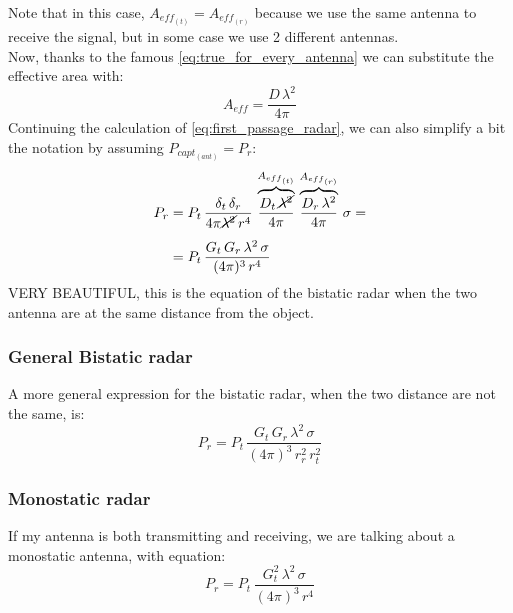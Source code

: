 Note that in this case, $A_{eff_{(t)}}=A_{eff_{(r)}}$ because we use the same antenna to receive the signal, but in some case we use 2 different antennas.\\
Now, thanks to the famous \cref{eq:true_for_every_antenna} we can substitute the effective area with:
\begin{equation}
    A_{eff}=\frac{D\,\lambda^2}{4\pi}
\end{equation}
Continuing the calculation of \cref{eq:first_passage_radar}, we can also simplify a bit the notation by assuming $P_{capt_{(ant)}}=P_r$:
\begin{align}\label{eq:received_power_radar}
    \begin{split}
    P_{r}&=P_t\,\frac{\delta_t\,\delta_r}{4\pi\cancel{\lambda^2}\,r^4}\,\overbrace{\frac{D_t\,\cancel{\lambda^2}}{4\pi}}^{A_{{eff}_{(t)}}}\,\overbrace{\frac{D_r\,\lambda^2}{4\pi}}^{A_{{eff}_{(r)}}}\,\sigma=\\[5pt]
    &=P_t\,\frac{G_t\,G_r\,\lambda^2\,\sigma}{(4\pi)^3\,r^4}
    \end{split}
\end{align}
VERY BEAUTIFUL, this is the equation of the bistatic radar when the two antenna are at the same distance from the object.
\subsubsection*{General Bistatic radar}
A more general expression for the bistatic radar, when the two distance are not the same, is:
\begin{equation}
    P_{r}=P_t\,\frac{G_t\,G_r\,\lambda^2\,\sigma}{(4\pi)^3\,r^2_r\,r^2_t}
\end{equation}
\subsubsection*{Monostatic radar}
If my antenna is both transmitting and receiving, we are talking about a monostatic antenna, with equation:
\begin{equation}\label{eq:received_power_radar_monostatic}
    P_{r}=P_t\,\frac{G_t^2\,\lambda^2\,\sigma}{(4\pi)^3\,r^4}
\end{equation}
